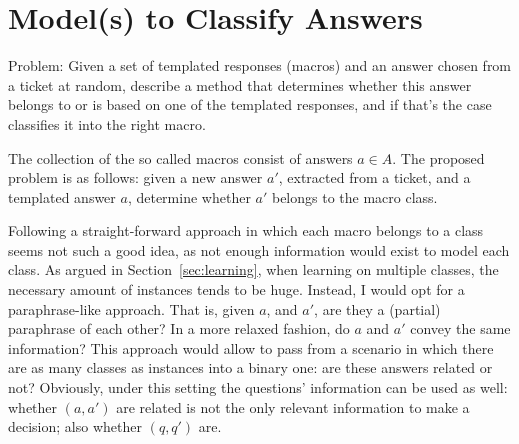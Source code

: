 \documentclass[11pt]{article}
\begin{document}


% 
% 

\section{Model(s) to Classify Answers}
\label{sec:answers}

Problem: Given a set of templated responses (macros) and an answer chosen from a 
ticket at random, describe a method that determines whether this answer belongs 
to or is based on one of the templated responses, and if that's the case 
classifies it into the right macro.
\medskip

The collection of the so called macros consist of answers $a\in A$. The proposed 
problem is as follows: given a new answer $a'$, extracted from a ticket, and a 
templated answer $a$,  determine whether $a'$ belongs to the macro class. 

Following a straight-forward approach in which each macro belongs to a class 
seems not such a good idea, as not enough information would exist to model each 
class. As argued in Section~\ref{sec:learning}, when learning on multiple 
classes, the necessary amount of instances tends to be huge. Instead, I would 
opt for a paraphrase-like approach. That is, given $a$, and $a'$, are they a 
(partial) paraphrase of each other? In a more relaxed fashion, do $a$ and 
$a'$ convey the same information? This approach would allow to pass from a 
scenario in which there are as many classes as instances into a binary one: are 
these answers related or not? Obviously, under this setting the questions' 
information can be used as well: whether $(a,a')$ are related is not the only 
relevant information to make a decision; also whether $(q,q')$ are. 
\end{document}
